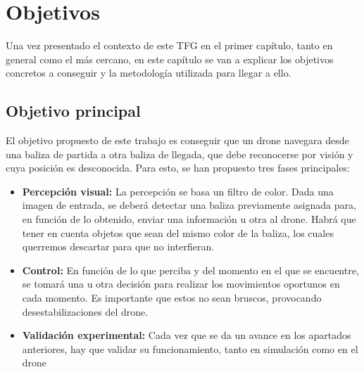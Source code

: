 \chapter{Objetivos}\label{cap.Objetivos}
\hspace{1 cm} Una vez presentado el contexto de este TFG en el primer cap\'itulo, tanto en general como el m\'as cercano, en este cap\'itulo se van a explicar los objetivos concretos a conseguir y la metodolog\'ia utilizada para llegar a ello.

\section{Objetivo principal}
\hspace{1 cm} El objetivo propuesto de este trabajo es conseguir que un drone navegara desde una baliza de partida a otra baliza de llegada, que debe reconocerse por visi\'on y cuya posici\'on es desconocida. Para esto, se han propuesto tres fases principales:

\begin{itemize}
\item \textbf{Percepci\'on visual:} La percepci\'on se basa un filtro de color. Dada una imagen de entrada, se deber\'a detectar una baliza previamente asignada para, en funci\'on de lo obtenido, enviar una informaci\'on u otra al drone. Habr\'a que tener en cuenta objetos que sean del mismo color de la baliza, los cuales querremos descartar para que no interfieran. 

\item \textbf{Control:} En funci\'on de lo que perciba y del momento en el que se encuentre, se tomar\'a una u otra decisi\'on para realizar los movimientos oportunos en cada momento. Es importante que estos no sean bruscos, provocando desestabilizaciones del drone.

\item \textbf{Validaci\'on experimental:} Cada vez que se da un avance en los apartados anteriores, hay que validar su funcionamiento, tanto en simulaci\'on como en el drone

\end{itemize}

